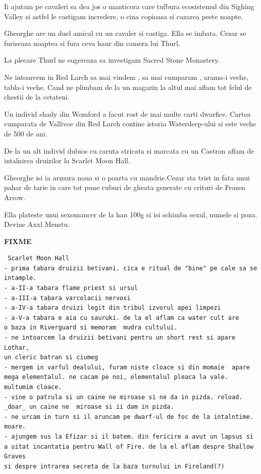 \documentclass[12pt,oneside]{book}
\begin{document}
Ii ajutam pe cavaleri sa dea jos o manticora care tulbura ecosistemul din Sighing Valley si 
astfel le castigam incredere, o cina copioasa si cazarea peste noapte.

Gheorghe are un duel amical cu un cavaler si castiga. Ella se imbata. Cezar se furiseaza
noaptea si fura ceva haur din camera lui Thurl.

La plecare Thurl ne sugereaza sa investigam Sacred Stone Monastery.

Ne intoarcem in Red Larch sa mai vindem , sa mai cumparam , arama-i veche, tabla-i veche.
Cand ne plimbam de la un magazin la altul mai aflam tot felul de chestii de la cetateni.

Un individ shady din Womford a facut rost de mai multe carti dwarfice. Cartea
cumparata de Vallivoe din Red Larch contine istoria Waterdeep-ului si este veche 
de 500 de ani.

De la un alt individ dubios cu caruta stricata si marcata cu un Castron aflam de intalnirea 
druizilor la Scarlet Moon Hall.

Gheorghe isi ia armura noua si o poarta cu mandrie.Cezar sta trist in fata unui pahar de tarie in  care tot pune cuburi de gheata generate cu crituri de Frozen Arrow.

Ella plateste unui sexomancer de la han 100g si isi schimba sexul, numele si poza. Devine Axxl Menstu.



\textbf{FIXME}
\begin{verbatim}
 Scarlet Moon Hall
- prima tabara druizii betivani. cica e ritual de "bine" pe cale sa se intample.
- a-II-a tabara flame priest si ursul
- a-III-a tabara varcolacii nervosi
- a-IV-a tabara druizi legit din tribul izvorul apei limpezi
- a-V-a tabara e aia cu sauruki. de la el aflam ca water cult are 
o baza in Riverguard si memoram  mudra cultului. 
- ne intoarcem la druizii betivani pentru un short rest si apare Lothar, 
un cleric batran si ciumeg
- mergem in varful dealului, furam niste cloace si din momaie  apare 
mega elementalul. ne cacam pe noi, elementalul pleaca la vale. multumim cloace.
- vine o patrula si un caine ne miroase si ne da in pizda. reload. 
_doar_ un caine ne  miroase si ii dam in pizda.
- ne urcam in turn si il aruncam pe dwarf-ul de foc de la intalntime. moare.
- ajungem sus la Efizar si il batem. din fericire a avut un lapsus si 
a uitat incantatia pentru Wall of Fire. de la el aflam despre Shallow Graves 
si despre intrarea secreta de la baza turnului in Fireland(?)
\end{verbatim}
\end{document}
